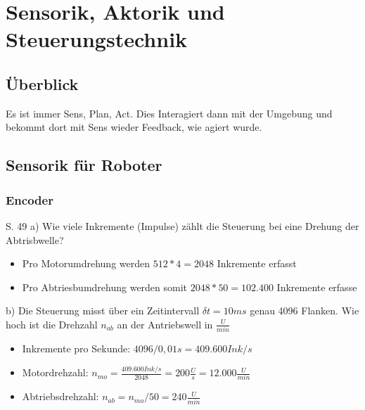 \documentclass[a4paper]{article}
\title{\docTitle}
\author{Moritz}
\date{\today}
\begin{document}
\maketitle
\tableofcontents


\section{Sensorik, Aktorik und Steuerungstechnik}

\subsection{Überblick}

Es ist immer Sens, Plan, Act. Dies Interagiert dann mit der Umgebung und bekommt dort mit Sens wieder Feedback, wie agiert wurde.

\subsection{Sensorik für Roboter}

\subsubsection{Encoder}

S. 49 a) Wie viele Inkremente (Impulse) zählt die Steuerung bei eine Drehung der Abtrisbwelle?

\begin{itemize}
    \item Pro Motorumdrehung werden $512 * 4 = 2048$ Inkremente erfasst
    \item Pro Abtriesbumdrehung werden somit $2048 * 50 = 102.400$ Inkremente erfasse
\end{itemize}

b) Die Steuerung misst über ein Zeitintervall $\delta t = 10ms$ genau 4096 Flanken. Wie hoch ist die Drehzahl $n_{ab}$ an der Antriebswell in $\frac{U}{min}$

\begin{itemize}
    \item Inkremente pro Sekunde: $4096 / 0,01s = 409.600 Ink/s$
    \item Motordrehzahl: $n_{mo} = \frac{409.600 Ink/s}{2048} = 200\frac{U}{s} = 12.000 \frac{U}{min}$
    \item Abtriebsdrehzahl: $n_{ab} = n_{mo}/50 = 240 \frac{U}{min}$
\end{itemize}
\end{document}
